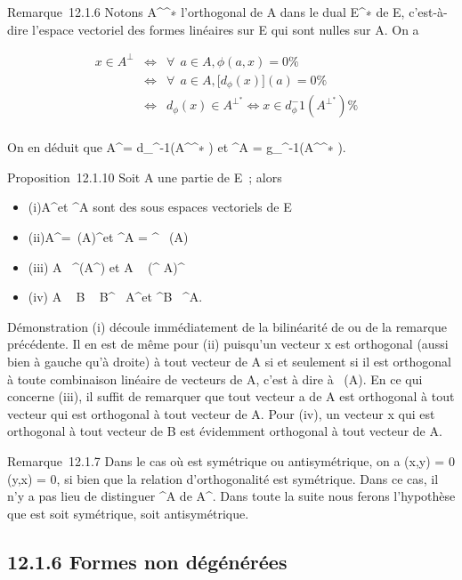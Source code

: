 \documentclass[]{article}
\begin{document}
Remarque~12.1.6 Notons A^\bot^∗  l'orthogonal de A
dans le dual E^∗ de E, c'est-à-dire l'espace vectoriel des
formes linéaires sur E qui sont nulles sur A. On a

\begin{align*} x \in A^\bot&
\Leftrightarrow & \forall~~a \in A, \phi(a,x)
= 0 \%& \\ &
\Leftrightarrow & \forall~~a \in A,
\big [d_\phi(x)\big ](a) = 0
\%& \\ & \Leftrightarrow &
d_\phi(x) \in A^\bot^∗ 
\Leftrightarrow x \in
d_\phi^-1(A^\bot^∗ )\%&
\\ \end{align*}

On en déduit que A^\bot =
d_\phi^-1(A^\bot^∗ ) et ^\bot A
= g_\phi^-1(A^\bot^∗ ).

Proposition~12.1.10 Soit A une partie de E~; alors

\begin{itemize}
\itemsep1pt\parskip0pt
\item
  (i)A^\bot et ^\bot A sont des sous espaces vectoriels
  de E
\item
  (ii)A^\bot =\
  \mathrmVect(A)^\bot et ^\bot A
  = ^\bot
  \mathrmVect~(A)
\item
  (iii) A \subset~^\bot (A^\bot) et A \subset~ (^\bot
  A)^\bot
\item
  (iv) A \subset~ B \rigtharrow~ B^\bot\subset~ A^\bot et ^\bot B
  \subset~^\bot A.
\end{itemize}

Démonstration (i) découle immédiatement de la bilinéarité de \phi ou de la
remarque précédente. Il en est de même pour (ii) puisqu'un vecteur x est
orthogonal (aussi bien à gauche qu'à droite) à tout vecteur de A si et
seulement si il est orthogonal à toute combinaison linéaire de vecteurs
de A, c'est à dire à
\mathrmVect~(A). En ce qui
concerne (iii), il suffit de remarquer que tout vecteur a de A est
orthogonal à tout vecteur qui est orthogonal à tout vecteur de A. Pour
(iv), un vecteur x qui est orthogonal à tout vecteur de B est évidemment
orthogonal à tout vecteur de A.

Remarque~12.1.7 Dans le cas où \phi est symétrique ou antisymétrique, on a
\phi(x,y) = 0 \Leftrightarrow \phi(y,x) = 0, si bien que la
relation d'orthogonalité est symétrique. Dans ce cas, il n'y a pas lieu
de distinguer ^\bot A de A^\bot. Dans toute la suite
nous ferons l'hypothèse que \phi est soit symétrique, soit antisymétrique.

\subsection{12.1.6 Formes non dégénérées}
\end{document}
